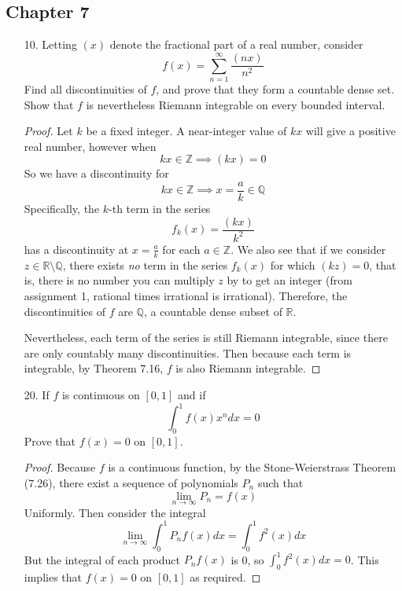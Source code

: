 \documentclass[hidelinks,12pt]{article}
\newcommand{\R}{\mathbb{R}}
\newcommand{\Z}{\mathbb{Z}}
\newcommand{\Q}{\mathbb{Q}}
\begin{document}
\subsection*{Chapter 7}
\begin{enumerate}
    \item[10.] Letting \((x)\) denote the fractional part of a real number, consider \[
    f(x)=\sum_{n=1}^{\infty}\frac{(nx)}{n^{2}}
    \]
   Find all discontinuities of \(f\), and prove that they form a countable dense set. Show that \(f\) is nevertheless Riemann integrable on every bounded interval. 
   \begin{proof}
       Let \(k\) be a fixed integer. A near-integer value of \(kx\) will give a positive real number, however when
       \[
           kx\in\Z\implies(kx)=0
       \]
       So we have a discontinuity for
       \[
           kx\in\Z\implies x=\frac{a}{k}\in\Q
       \]
       Specifically, the \(k\)-th term in the series
       \[
           f_{k}(x)=\frac{(kx)}{k^{2}}
       \]
       has a discontinuity at \(x=\frac{a}{k}\) for each \(a\in\Z\).
       We also see that if we consider \(z\in\R\setminus\Q\), there exists \emph{no} term in the series \(f_{k}(x)\) for which \((kz)=0\), that is, there is no number you can multiply \(z\) by to get an integer (from assignment 1, rational times irrational is irrational). Therefore, the discontinuities of \(f\) are \(\Q\), a countable dense subset of \(\R\).\par\null\par Nevertheless, each term of the series is still Riemann integrable, since there are only countably many discontinuities. Then because each term is integrable, by Theorem 7.16, \(f\) is also Riemann integrable.
   \end{proof}
\item[20.] If \(f\) is continuous on \([0,1]\) and if \[
        \int_{0}^{1}f(x)x^{n}dx=0\tag{n=1,2,3,\dots}
\]
Prove that \(f(x)=0\) on \([0,1]\).
\begin{proof}
    Because \(f\) is a continuous function, by the Stone-Weierstrass Theorem (7.26), there exist a sequence of polynomials \(P_{n}\) such that
    \[
        \lim_{n\to\infty}P_{n}=f(x)
    \]
    Uniformly. Then consider the integral \[
    \lim_{n\to\infty}\int_{0}^{1}P_{n}f(x)dx=\int_{0}^{1}f^{2}(x)dx
    \]
    But the integral of each product \(P_{n}f(x)\) is 0, so \(\int_{0}^{1}f^{2}(x)dx=0\). This implies that \(f(x)=0\) on \([0,1]\) as required.
\end{proof}
\end{enumerate}
\end{document}
